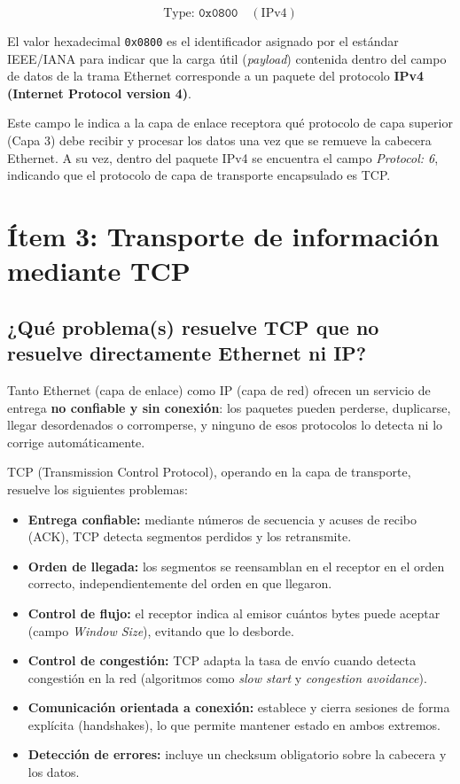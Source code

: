 \documentclass[12pt,a4paper]{article}
\let\oldsection\section
\renewcommand{\section}{\clearpage\oldsection}
\begin{document}
$$\text{Type: } \texttt{0x0800} \quad (\text{IPv4})$$

El valor hexadecimal \texttt{0x0800} es el identificador asignado por el estándar IEEE/IANA para indicar que la carga útil (\textit{payload}) contenida dentro del campo de datos de la trama Ethernet corresponde a un paquete del protocolo \textbf{IPv4 (Internet Protocol version 4)}.

Este campo le indica a la capa de enlace receptora qué protocolo de capa superior (Capa 3) debe recibir y procesar los datos una vez que se remueve la cabecera Ethernet. A su vez, dentro del paquete IPv4 se encuentra el campo \textit{Protocol: 6}, indicando que el protocolo de capa de transporte encapsulado es TCP.

\section{Ítem 3: Transporte de información mediante TCP}

\subsection{¿Qué problema(s) resuelve TCP que no resuelve directamente Ethernet ni IP?}

Tanto Ethernet (capa de enlace) como IP (capa de red) ofrecen un servicio de entrega \textbf{no confiable y sin conexión}: los paquetes pueden perderse, duplicarse, llegar desordenados o corromperse, y ninguno de esos protocolos lo detecta ni lo corrige automáticamente.

TCP (Transmission Control Protocol), operando en la capa de transporte, resuelve los siguientes problemas:

\begin{itemize}
  \item \textbf{Entrega confiable:} mediante números de secuencia y acuses de recibo (ACK), TCP detecta segmentos perdidos y los retransmite.
  \item \textbf{Orden de llegada:} los segmentos se reensamblan en el receptor en el orden correcto, independientemente del orden en que llegaron.
  \item \textbf{Control de flujo:} el receptor indica al emisor cuántos bytes puede aceptar (campo \textit{Window Size}), evitando que lo desborde.
  \item \textbf{Control de congestión:} TCP adapta la tasa de envío cuando detecta congestión en la red (algoritmos como \textit{slow start} y \textit{congestion avoidance}).
  \item \textbf{Comunicación orientada a conexión:} establece y cierra sesiones de forma explícita (handshakes), lo que permite mantener estado en ambos extremos.
  \item \textbf{Detección de errores:} incluye un checksum obligatorio sobre la cabecera y los datos.
\end{itemize}
\end{document}

